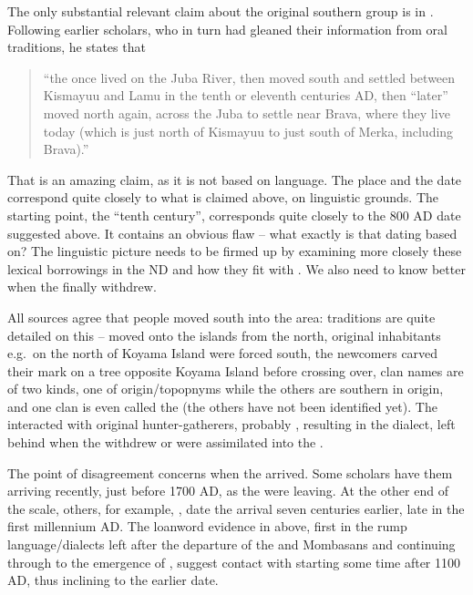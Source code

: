 \documentclass[output=paper
,newtxmath
,modfonts
,nonflat]{langsci/langscibook}
\begin{document}
The only substantial relevant claim about the original southern  group is in \citet[15ff]{Lewis1969}. Following earlier  scholars, who in turn had gleaned their information from  oral traditions, he states that \begin{quotation}“the  once lived on the Juba River, then moved south and settled between Kismayuu and Lamu in the tenth or eleventh centuries AD, then “later” moved north again, across the Juba to settle near Brava, where they live today (which is just north of Kismayuu to just south of Merka, including Brava).”\end{quotation} That is an amazing claim, as it is not based on language. The place and the date correspond quite closely to what is claimed above, on linguistic grounds. The starting point, the “tenth century”, corresponds quite closely to the 800 AD date suggested above. It contains an obvious flaw – what exactly is that dating based on? The linguistic picture needs to be firmed up by examining more closely these lexical borrowings in the ND and how they fit with . We also need to know better when the  finally withdrew.

All sources agree that  people moved south into the area:  traditions are quite detailed on this –  moved onto the islands from the north, original inhabitants e.g.\ on the north of Koyama Island were forced south, the newcomers carved their mark on a tree opposite Koyama Island before crossing over,  clan names are of two kinds, one of  origin/topopnyms while the others are southern  in origin, and one clan is even called the  (the others have not been identified yet). The  interacted with original hunter-gatherers, probably , resulting in the  dialect, left behind when the  withdrew or were assimilated into the .  

The point of disagreement concerns when the  arrived. Some scholars have them arriving recently, just before 1700 AD, as the  were leaving. At the other end of the scale, others, for example, \citet{Ali1985}, date the  arrival seven centuries earlier, late in the first millennium AD. The loanword evidence in  above, first in the rump language/dialects left after the departure of the  and Mombasans and continuing through to the emergence of , suggest contact with  starting some time after 1100 AD, thus inclining to the earlier date.
\end{document}
